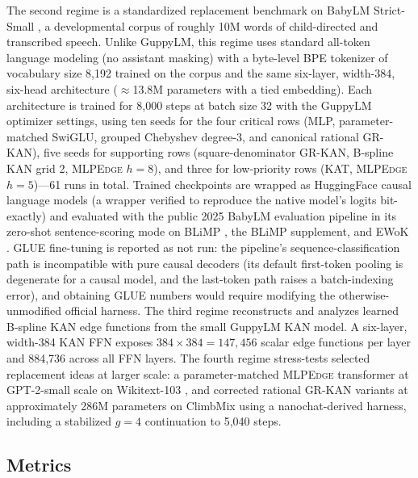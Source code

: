 \documentclass[11pt]{article}
\newcommand{\modelname}[1]{\textsc{#1}}
\newcommand{\grkan}{\modelname{GR-KAN}}
\newcommand{\mlpedge}{\modelname{MLPEdge}}
\begin{document}
The second regime is a standardized replacement benchmark on BabyLM Strict-Small \cite{warstadt2023babylm}, a developmental corpus of roughly 10M words of child-directed and transcribed speech. Unlike GuppyLM, this regime uses standard all-token language modeling (no assistant masking) with a byte-level BPE tokenizer of vocabulary size 8,192 trained on the corpus and the same six-layer, width-384, six-head architecture (\(\approx\)13.8M parameters with a tied embedding). Each architecture is trained for 8,000 steps at batch size 32 with the GuppyLM optimizer settings, using ten seeds for the four critical rows (MLP, parameter-matched SwiGLU, grouped Chebyshev degree-3, and canonical rational \grkan{}), five seeds for supporting rows (square-denominator \grkan{}, B-spline KAN grid 2, \mlpedge{} \(h=8\)), and three for low-priority rows (KAT, \mlpedge{} \(h=5\))---61 runs in total. Trained checkpoints are wrapped as HuggingFace causal language models (a wrapper verified to reproduce the native model's logits bit-exactly) and evaluated with the public 2025 BabyLM evaluation pipeline \cite{babylm2025eval} in its zero-shot sentence-scoring mode on BLiMP \cite{warstadt2020blimp}, the BLiMP supplement, and EWoK \cite{ivanova2024ewok}. GLUE fine-tuning is reported as not run: the pipeline's sequence-classification path is incompatible with pure causal decoders (its default first-token pooling is degenerate for a causal model, and the last-token path raises a batch-indexing error), and obtaining GLUE numbers would require modifying the otherwise-unmodified official harness. The third regime reconstructs and analyzes learned B-spline KAN edge functions from the small GuppyLM KAN model. A six-layer, width-384 KAN FFN exposes \(384\times384=147{,}456\) scalar edge functions per layer and 884,736 across all FFN layers. The fourth regime stress-tests selected replacement ideas at larger scale: a parameter-matched \mlpedge{} transformer at GPT-2-small scale \cite{radford2019language} on Wikitext-103 \cite{merity2017pointer}, and corrected rational \grkan{} variants at approximately 286M parameters on ClimbMix using a nanochat-derived harness, including a stabilized \(g=4\) continuation to 5,040 steps.

\subsection{Metrics}
\end{document}
